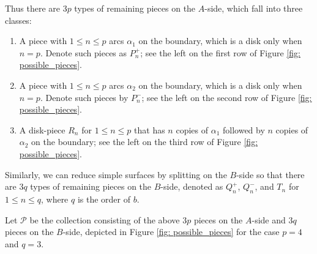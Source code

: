 \documentclass{amsart}
\theoremstyle{definition}
\numberwithin{equation}{section}
\theoremstyle{theorem}
\theoremstyle{remark}
\begin{document}
	Thus there are $3p$ types of remaining pieces on the $A$-side, which fall into three classes: 
	\begin{enumerate}
		\item A piece with $1\le n\le p$ arcs $\alpha_1$ on the boundary, which is a disk only when $n=p$. Denote such pieces as $P_n^+$; see the left on the first row of Figure \ref{fig: possible_pieces}.
		\item A piece with $1\le n\le p$ arcs $\alpha_2$ on the boundary, which is a disk only when $n=p$. Denote such pieces by $P_n^-$; see the left on the second row of Figure \ref{fig: possible_pieces}.
		\item A disk-piece $R_n$ for $1\le n\le p$ that has $n$ copies of $\alpha_1$ followed by $n$ copies of $\alpha_2$ on the boundary; see the left on the third row of Figure \ref{fig: possible_pieces}.
	\end{enumerate}
	
	Similarly, we can reduce simple surfaces by splitting on the $B$-side so that there are $3q$ types of remaining pieces on the $B$-side, denoted as $Q_n^+$, $Q_n^-$, and $T_n$ for $1\le n\le q$, where $q$ is the order of $b$.
	
	Let $\mathcal{P}$ be the collection consisting of the above $3p$ pieces on the $A$-side and $3q$ pieces on the $B$-side, depicted in Figure \ref{fig: possible_pieces} for the case $p=4$ and $q=3$.
	
\end{document}
